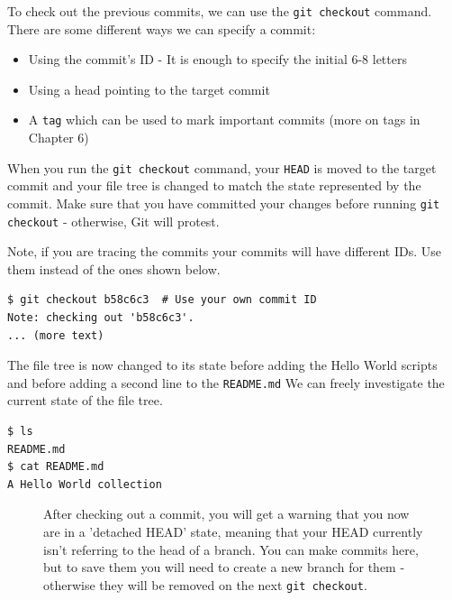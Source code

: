 \documentclass[../main/git_course_main.tex]{subfiles}
\begin{document}
To check out the previous commits, we can use the \verb$git checkout$ command. There are some different ways we can specify a commit:

\begin{itemize}
	\item Using the commit's ID - It is enough to specify the initial 6-8 letters
	\item Using a head pointing to the target commit
	\item A \verb$tag$ which can be used to mark important commits (more on tags in Chapter 6)
\end{itemize}

When you run the \verb$git checkout$ command, your \verb$HEAD$ is moved to the target commit and your file tree is changed to match the state represented by the commit. Make sure that you have committed your changes before running \verb$git checkout$ - otherwise, Git will protest.

Note, if you are tracing the commits your commits will have different IDs. Use them instead of the ones shown below.

\begin{codebox}
\begin{lstlisting}
$ git checkout b58c6c3  # Use your own commit ID
Note: checking out 'b58c6c3'.
... (more text)
\end{lstlisting}
\end{codebox}

The file tree is now changed to its state before adding the Hello World scripts and before adding a second line to the \verb$README.md$ We can freely investigate the current state of the file tree.

\begin{codebox}
\begin{lstlisting}
$ ls
README.md
$ cat README.md
A Hello World collection
\end{lstlisting}
\end{codebox}

\begin{figure}[h!]
\begin{redbox}
After checking out a commit, you will get a warning that you now are in a 'detached HEAD' state, meaning that your HEAD currently isn't referring to the head of a branch.
You can make commits here, but to save them you will need to create a new branch for them - otherwise
they will be removed on the next \verb$git checkout$.
\end{redbox}
\end{figure}
\end{document}
